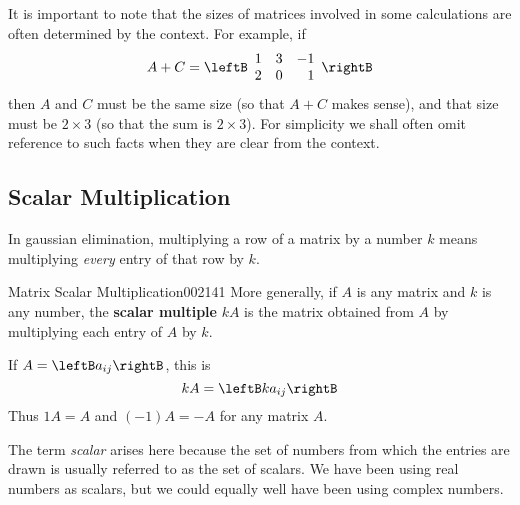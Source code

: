 It is important to note that the sizes of matrices involved in some 
calculations are often determined by the context. For example, if
\begin{equation*}
A + C = \leftB \begin{array}{rrr}
1 & 3 & -1 \\
2 & 0 & 1
\end{array} \rightB
\end{equation*}
then $A$ and $C$ must be the same size (so that $A + C$ makes sense), and that size must be $2 \times 3$ (so that the sum is $2 \times 3$). For simplicity we shall often omit reference to such facts when they are clear from the context.


\subsection*{Scalar Multiplication}


In gaussian elimination, multiplying a row of a matrix by a number $k$ means multiplying \textit{every} entry of that row by $k$.


\begin{definition}{Matrix Scalar Multiplication}{002141}
More generally, if $A$ is any matrix and $k$ is any number, the \textbf{scalar multiple} $kA$ is the matrix obtained from $A$ by multiplying each entry of $A$ by $k$.
\end{definition}

\noindent If $A = \leftB a_{ij} \rightB$, this is
\begin{equation*}
kA = \leftB ka_{ij} \rightB
\end{equation*}
Thus $1A = A$ and $(-1)A = -A$ for any matrix $A$.

The term \textit{scalar} arises here because the set of numbers from which the entries are drawn is usually referred to as the set of scalars. We have been using real numbers as scalars, but we could equally well have been using complex numbers.


